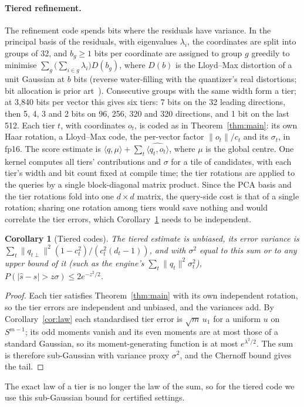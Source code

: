 \documentclass[fleqn,10pt]{wlscirep}
\newtheorem{corollary}{Corollary}
\begin{document}
\paragraph{Tiered refinement.} The refinement code spends bits where the residuals have variance. In the principal basis of the residuals, with eigenvalues $\lambda_i$, the coordinates are split into groups of 32, and $b_g\ge1$ bits per coordinate are assigned to group $g$ greedily to minimise $\sum_g\big(\sum_{i\in g}\lambda_i\big)D(b_g)$, where $D(b)$ is the Lloyd--Max distortion of a unit Gaussian at $b$ bits (reverse water-filling with the quantizer's real distortions; bit allocation is prior art~\cite{saq2025}). Consecutive groups with the same width form a tier; at 3{,}840 bits per vector this gives six tiers: 7 bits on the 32 leading directions, then 5, 4, 3 and 2 bits on 96, 256, 320 and 320 directions, and 1 bit on the last 512. Each tier $t$, with coordinates $o_t$, is coded as in Theorem~\ref{thm:main}: its own Haar rotation, a Lloyd--Max code, the per-vector factor $\|o_t\|/c_t$ and its $\sigma_t$, in fp16. The score estimate is $\langle q,\mu\rangle+\sum_t\widehat{\langle q_t,o_t\rangle}$, where $\mu$ is the global centre. One kernel computes all tiers' contributions and $\sigma$ for a tile of candidates, with each tier's width and bit count fixed at compile time; the tier rotations are applied to the queries by a single block-diagonal matrix product. Since the PCA basis and the tier rotations fold into one $d\times d$ matrix, the query-side cost is that of a single rotation; sharing one rotation among tiers would save nothing and would correlate the tier errors, which Corollary~\ref{cor:tier} needs to be independent.
\begin{corollary}[Tiered codes]\label{cor:tier}
The tiered estimate is unbiased, its error variance is $\sum_t\|q_{t\perp}\|^2(1-c_t^2)/(c_t^2(d_t-1))$, and with $\sigma^2$ equal to this sum or to any upper bound of it (such as the engine's $\sum_t\|q_t\|^2\sigma_t^2$), $P(|\hat s-s|>z\sigma)\le2e^{-z^2/2}$.
\end{corollary}
\begin{proof}
Each tier satisfies Theorem~\ref{thm:main} with its own independent rotation, so the tier errors are independent and unbiased, and the variances add. By Corollary~\ref{cor:law} each standardised tier error is $\sqrt{m}\,u_1$ for a uniform $u$ on $S^{m-1}$; its odd moments vanish and its even moments are at most those of a standard Gaussian, so its moment-generating function is at most $e^{\lambda^2/2}$. The sum is therefore sub-Gaussian with variance proxy $\sigma^2$, and the Chernoff bound gives the tail.
\end{proof}
The exact law of a tier is no longer the law of the sum, so for the tiered code we use this sub-Gaussian bound for certified settings.
\end{document}
